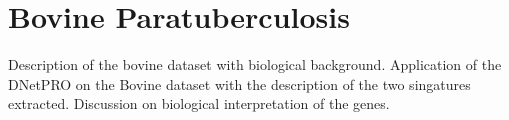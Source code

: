 \documentclass{standalone}
\begin{document}
\section[Bovine Dataset]{Bovine Paratuberculosis}\label{bovine}

Description of the bovine dataset with biological background.
Application of the DNetPRO on the Bovine dataset with the description of the two singatures extracted.
Discussion on biological interpretation of the genes.
\end{document}
